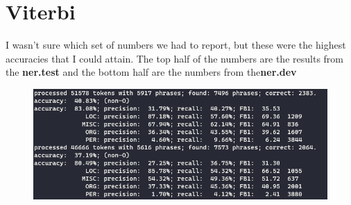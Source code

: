 \documentclass[12pt]{article}
\begin{document}
\section{Viterbi}
I wasn't sure which set of numbers we had to report, but these were the highest accuracies that I could attain. The top half of the numbers are the results from the \textbf{ner.test} and the bottom half are the numbers from the\textbf{ner.dev}
\begin{figure}[h!]
	\includegraphics[scale=0.8]{1.png}
\end{figure} 
\end{document}
